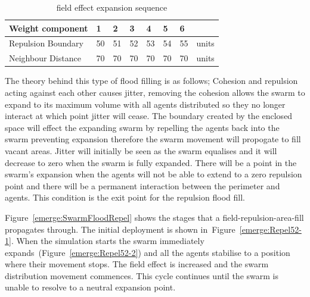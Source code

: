 \begin{table}[H]
\begin{center}
\begin{tabular}{| p{2cm} | p{0.6cm} | p{0.6cm} | p{0.6cm} | p{0.6cm} | p{0.6cm} | p{0.6cm} | p{1cm} |}
\hline
\bf Weight \bf component & \bf 1 & \bf 2 & \bf 3 & \bf 4 & \bf 5 & \bf 6 & \\ \hline
Repulsion Boundary & 50 & 51 & 52 & 53 & 54 & 55 & units\\  \hline
Neighbour Distance & 70 & 70 & 70 & 70 & 70 & 70 & units\\  \hline
\end{tabular}\caption{field effect expansion sequence} \label{tab:emerge:BaselineConcaveReduction}
\end{center}
\end{table}

The theory behind this type of flood filling is as follows; Cohesion and repulsion acting against each other causes jitter, removing the cohesion allows the swarm to expand to its maximum volume with all agents distributed so they no longer interact at which point jitter will cease. The boundary created by the enclosed space will effect the expanding swarm by repelling the agents back into the swarm preventing expansion therefore the swarm movement will propogate to fill vacant areas. Jitter will initially be seen as the swarm equalises and it will decrease to zero when the swarm is fully expanded. There will be a point in the swarm's expansion when the agents will not be able to extend to a zero repulsion point and there will be a permanent interaction between the perimeter and agents. This condition is the exit point for the repulsion flood fill.

Figure~\ref{emerge:SwarmFloodRepel} shows the stages that a field-repulsion-area-fill propagates through. The initial deployment is shown in~Figure~\ref{emerge:Repel52-1}. When the simulation starts the swarm immediately expands~(Figure~\ref{emerge:Repel52-2}) and all the agents stabilise to a position where their movement stops. The field effect is increased and the swarm distribution movement commences. This cycle continues until the swarm is unable to resolve to a neutral expansion point.

